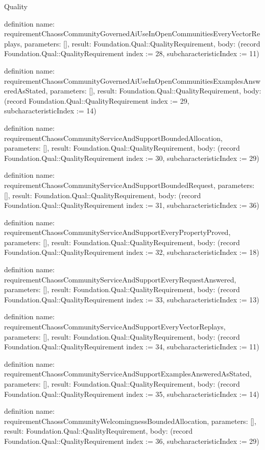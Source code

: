 \begin{lexlean}{Quality}
\begin{semanticmodule}
definition{
  name: requirementChaossCommunityGovernedAiUseInOpenCommunitiesEveryVectorReplays,
  parameters: [],
  result: Foundation.Qual::QualityRequirement,
  body: (record Foundation.Qual::QualityRequirement {index := 28, subcharacteristicIndex := 11})
}

definition{
  name: requirementChaossCommunityGovernedAiUseInOpenCommunitiesExamplesAnsweredAsStated,
  parameters: [],
  result: Foundation.Qual::QualityRequirement,
  body: (record Foundation.Qual::QualityRequirement {index := 29, subcharacteristicIndex := 14})
}

definition{
  name: requirementChaossCommunityServiceAndSupportBoundedAllocation,
  parameters: [],
  result: Foundation.Qual::QualityRequirement,
  body: (record Foundation.Qual::QualityRequirement {index := 30, subcharacteristicIndex := 29})
}

definition{
  name: requirementChaossCommunityServiceAndSupportBoundedRequest,
  parameters: [],
  result: Foundation.Qual::QualityRequirement,
  body: (record Foundation.Qual::QualityRequirement {index := 31, subcharacteristicIndex := 36})
}

definition{
  name: requirementChaossCommunityServiceAndSupportEveryPropertyProved,
  parameters: [],
  result: Foundation.Qual::QualityRequirement,
  body: (record Foundation.Qual::QualityRequirement {index := 32, subcharacteristicIndex := 18})
}

definition{
  name: requirementChaossCommunityServiceAndSupportEveryRequestAnswered,
  parameters: [],
  result: Foundation.Qual::QualityRequirement,
  body: (record Foundation.Qual::QualityRequirement {index := 33, subcharacteristicIndex := 13})
}

definition{
  name: requirementChaossCommunityServiceAndSupportEveryVectorReplays,
  parameters: [],
  result: Foundation.Qual::QualityRequirement,
  body: (record Foundation.Qual::QualityRequirement {index := 34, subcharacteristicIndex := 11})
}

definition{
  name: requirementChaossCommunityServiceAndSupportExamplesAnsweredAsStated,
  parameters: [],
  result: Foundation.Qual::QualityRequirement,
  body: (record Foundation.Qual::QualityRequirement {index := 35, subcharacteristicIndex := 14})
}

definition{
  name: requirementChaossCommunityWelcomingnessBoundedAllocation,
  parameters: [],
  result: Foundation.Qual::QualityRequirement,
  body: (record Foundation.Qual::QualityRequirement {index := 36, subcharacteristicIndex := 29})
}


\end{semanticmodule}
\end{lexlean}
